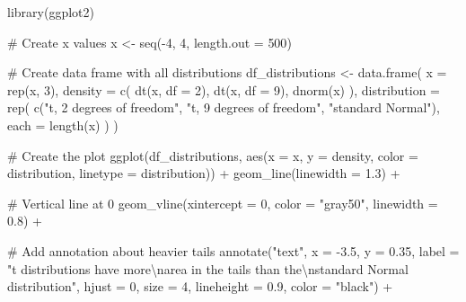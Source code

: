 \documentclass[
  letterpaper,
  DIV=11,
  numbers=noendperiod]{scrreprt}
\newenvironment{Shaded}{\begin{snugshade}}{\end{snugshade}}
\newcommand{\AttributeTok}[1]{\textcolor[rgb]{0.40,0.45,0.13}{#1}}
\newcommand{\CommentTok}[1]{\textcolor[rgb]{0.37,0.37,0.37}{#1}}
\newcommand{\DecValTok}[1]{\textcolor[rgb]{0.68,0.00,0.00}{#1}}
\newcommand{\FloatTok}[1]{\textcolor[rgb]{0.68,0.00,0.00}{#1}}
\newcommand{\FunctionTok}[1]{\textcolor[rgb]{0.28,0.35,0.67}{#1}}
\newcommand{\NormalTok}[1]{\textcolor[rgb]{0.00,0.23,0.31}{#1}}
\newcommand{\OtherTok}[1]{\textcolor[rgb]{0.00,0.23,0.31}{#1}}
\newcommand{\SpecialCharTok}[1]{\textcolor[rgb]{0.37,0.37,0.37}{#1}}
\newcommand{\StringTok}[1]{\textcolor[rgb]{0.13,0.47,0.30}{#1}}
\begin{document}
\begin{Shaded}
\begin{Highlighting}[]
\FunctionTok{library}\NormalTok{(ggplot2)}

\CommentTok{\# Create x values}
\NormalTok{x }\OtherTok{\textless{}{-}} \FunctionTok{seq}\NormalTok{(}\SpecialCharTok{{-}}\DecValTok{4}\NormalTok{, }\DecValTok{4}\NormalTok{, }\AttributeTok{length.out =} \DecValTok{500}\NormalTok{)}

\CommentTok{\# Create data frame with all distributions}
\NormalTok{df\_distributions }\OtherTok{\textless{}{-}} \FunctionTok{data.frame}\NormalTok{(}
  \AttributeTok{x =} \FunctionTok{rep}\NormalTok{(x, }\DecValTok{3}\NormalTok{),}
  \AttributeTok{density =} \FunctionTok{c}\NormalTok{(}
    \FunctionTok{dt}\NormalTok{(x, }\AttributeTok{df =} \DecValTok{2}\NormalTok{),}
    \FunctionTok{dt}\NormalTok{(x, }\AttributeTok{df =} \DecValTok{9}\NormalTok{),}
    \FunctionTok{dnorm}\NormalTok{(x)}
\NormalTok{  ),}
  \AttributeTok{distribution =} \FunctionTok{rep}\NormalTok{(}
    \FunctionTok{c}\NormalTok{(}\StringTok{"t, 2 degrees of freedom"}\NormalTok{, }
      \StringTok{"t, 9 degrees of freedom"}\NormalTok{, }
      \StringTok{"standard Normal"}\NormalTok{),}
    \AttributeTok{each =} \FunctionTok{length}\NormalTok{(x)}
\NormalTok{  )}
\NormalTok{)}

\CommentTok{\# Create the plot}
\FunctionTok{ggplot}\NormalTok{(df\_distributions, }\FunctionTok{aes}\NormalTok{(}\AttributeTok{x =}\NormalTok{ x, }\AttributeTok{y =}\NormalTok{ density, }
                              \AttributeTok{color =}\NormalTok{ distribution, }
                              \AttributeTok{linetype =}\NormalTok{ distribution)) }\SpecialCharTok{+}
  \FunctionTok{geom\_line}\NormalTok{(}\AttributeTok{linewidth =} \FloatTok{1.3}\NormalTok{) }\SpecialCharTok{+}
  
  \CommentTok{\# Vertical line at 0}
  \FunctionTok{geom\_vline}\NormalTok{(}\AttributeTok{xintercept =} \DecValTok{0}\NormalTok{, }\AttributeTok{color =} \StringTok{"gray50"}\NormalTok{, }\AttributeTok{linewidth =} \FloatTok{0.8}\NormalTok{) }\SpecialCharTok{+}
  
  \CommentTok{\# Add annotation about heavier tails}
  \FunctionTok{annotate}\NormalTok{(}\StringTok{"text"}\NormalTok{, }\AttributeTok{x =} \SpecialCharTok{{-}}\FloatTok{3.5}\NormalTok{, }\AttributeTok{y =} \FloatTok{0.35}\NormalTok{,}
           \AttributeTok{label =} \StringTok{"t distributions have more}\SpecialCharTok{\textbackslash{}n}\StringTok{area in the tails than the}\SpecialCharTok{\textbackslash{}n}\StringTok{standard Normal distribution"}\NormalTok{,}
           \AttributeTok{hjust =} \DecValTok{0}\NormalTok{, }\AttributeTok{size =} \DecValTok{4}\NormalTok{, }\AttributeTok{lineheight =} \FloatTok{0.9}\NormalTok{, }\AttributeTok{color =} \StringTok{"black"}\NormalTok{) }\SpecialCharTok{+}
  

\end{Highlighting}
\end{Shaded}
\end{document}
